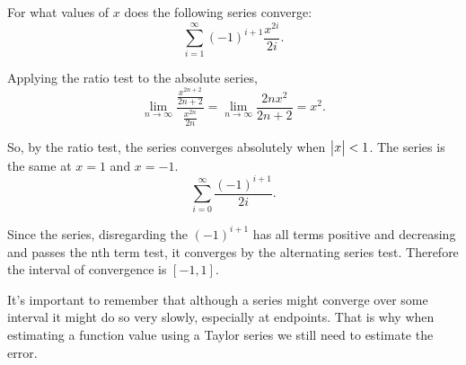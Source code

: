 \begin{example}
	For what values of $x$ does the following series converge:
	\begin{equation*}
		\sum_{i=1}^{\infty}{(-1)^{i+1}\frac{x^{2i}}{2i}}.
	\end{equation*}
\end{example}
\begin{answer}
	Applying the ratio test to the absolute series,
	\begin{equation*}
		\lim_{n\to\infty}{\frac{\frac{x^{2n+2}}{2n+2}}{\frac{x^{2n}}{2n}}} = \lim_{n\to\infty}{\frac{2nx^2}{2n+2}} = x^2.
	\end{equation*}

	So, by the ratio test, the series converges absolutely when $\big\lvert x \big\rvert<1$.
	The series is the same at $x=1$ and $x=-1$.
	\begin{equation*}
		\sum_{i=0}^{\infty}{\frac{(-1)^{i+1}}{2i}}.
	\end{equation*}

	Since the series, disregarding the $(-1)^{i+1}$ has all terms positive and decreasing and passes the nth term test, it converges by the alternating series test.
	Therefore the interval of convergence is $[-1,1]$.
\end{answer}

It's important to remember that although a series might converge over some interval it might do so very slowly, especially at endpoints.
That is why when estimating a function value using a Taylor series we still need to estimate the error.